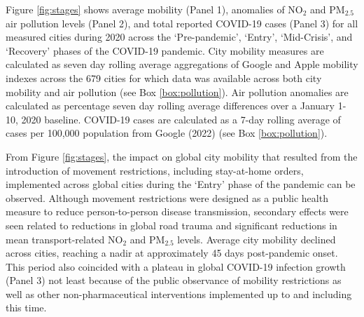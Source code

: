 \documentclass[preprint,10pt]{elsarticle} %
\begin{document}
Figure \ref{fig:stages} shows average mobility (Panel 1), anomalies of NO$_{2}$ and PM$_{2.5}$ air pollution levels (Panel 2), and total reported COVID-19 cases (Panel 3) for all measured cities during 2020 across the `Pre-pandemic', `Entry', `Mid-Crisis', and `Recovery' phases of the COVID-19 pandemic. City mobility measures are calculated as seven day rolling average aggregations of Google and Apple mobility indexes across the 679 cities for which data was available across both city mobility and air pollution (see Box \ref{box:pollution}). Air pollution anomalies are calculated as percentage seven day rolling average differences over a January 1-10, 2020 baseline. COVID-19 cases are calculated as a 7-day rolling average of cases per 100,000 population from Google (2022)\cite{Google2022} (see Box \ref{box:pollution}).

From Figure \ref{fig:stages}, the impact on global city mobility that resulted from the introduction of movement restrictions, including stay-at-home orders, implemented across global cities during the `Entry' phase\cite{hale2021global} of the pandemic can be observed. Although movement restrictions were designed as a public health measure to reduce person-to-person disease transmission, secondary effects were seen related to reductions in global road trauma \cite{ITFRS} and significant reductions in mean transport-related NO$_{2}$ and PM$_{2.5}$ levels\cite{zhang2023impact}. Average city mobility declined across cities, reaching a nadir at approximately 45 days post-pandemic onset. This period also coincided with a plateau in global COVID-19 infection growth (Panel 3) not least because of the public observance of mobility restrictions as well as other non-pharmaceutical interventions implemented up to and including this time\cite{hale2021global}. 
\end{document}
